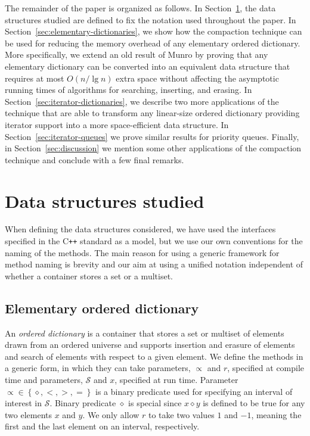 \documentclass{DIKU-article}
\newcommand{\set}[1]{\left\{#1\right\}}
\newcommand{\seclabel}[1]{\label{sec:#1}}
\newcommand{\secref}[1]{\mbox{Section~\ref{sec:#1}}}
\begin{document}
The remainder of the paper is organized as follows.  In
\secref{sec:def}, the data structures studied are defined to fix the
notation used throughout the paper.  In
\secref{elementary-dictionaries}, we show how the compaction technique
can be used for reducing the memory overhead of any elementary ordered
dictionary. More specifically, we extend an old result of Munro
\cite{Mun86} by proving that any elementary dictionary can be
converted into an equivalent data structure that requires at most
$O(n/\lg n)$ extra space without affecting the asymptotic running
times of algorithms for searching, inserting, and erasing.  In
\secref{iterator-dictionaries}, we describe two more applications of
the technique that are able to transform any linear-size ordered
dictionary providing iterator support into a more space-efficient data
structure. In \secref{iterator-queues} we prove similar results for
priority queues.  Finally, in \secref{discussion} we mention some
other applications of the compaction technique and conclude with a few
final remarks.

\section{Data structures studied}%
\seclabel{sec:def}

When defining the data structures considered, we have used the
interfaces specified in the C\texttt{++} standard \cite{ISO} as a
model, but we use our own conventions for the naming of the
methods. The main reason for using a generic framework for method
naming is brevity and our aim at using a unified notation independent
of whether a container stores a set or a multiset.

\subsection*{Elementary ordered dictionary}

An \emph{ordered dictionary} is a container that stores a set or
multiset of elements drawn from an ordered universe and supports
insertion and erasure of elements and search of elements with respect
to a given element.  We define the methods in a generic form, in which
they can take parameters, $\propto$ and $\mathit{r}$, specified at
compile time and parameters, $\mathcal{S}$ and $x$, specified at run
time. Parameter $\propto \in \set{\diamond,<,>,=}$ is a binary
predicate used for specifying an interval of interest in
$\mathcal{S}$. Binary predicate $\diamond$ is special since $x
\diamond y$ is defined to be true for any two elements $x$ and $y$. We
only allow $r$ to take two values $1$ and $-1$, meaning the first and
the last element on an interval, respectively.
\end{document}
